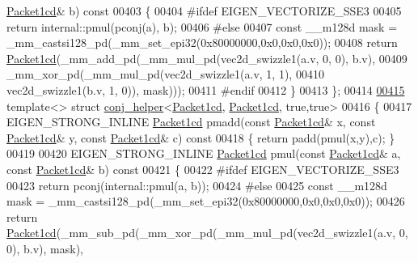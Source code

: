 \begin{DoxyCode}
      \hyperlink{struct_eigen_1_1internal_1_1_packet1cd}{Packet1cd}& b)\textcolor{keyword}{ const}
00403 \textcolor{keyword}{  }\{
00404 \textcolor{preprocessor}{    #ifdef EIGEN\_VECTORIZE\_SSE3}
00405     \textcolor{keywordflow}{return} internal::pmul(pconj(a), b);
00406 \textcolor{preprocessor}{    #else}
00407     \textcolor{keyword}{const} \_\_m128d mask = \_mm\_castsi128\_pd(\_mm\_set\_epi32(0x80000000,0x0,0x0,0x0));
00408     \textcolor{keywordflow}{return} \hyperlink{struct_eigen_1_1internal_1_1_packet1cd}{Packet1cd}(\_mm\_add\_pd(\_mm\_mul\_pd(vec2d\_swizzle1(a.v, 0, 0), b.v),
00409                                 \_mm\_xor\_pd(\_mm\_mul\_pd(vec2d\_swizzle1(a.v, 1, 1),
00410                                                       vec2d\_swizzle1(b.v, 1, 0)), mask)));
00411 \textcolor{preprocessor}{    #endif}
00412   \}
00413 \};
00414 
\hyperlink{struct_eigen_1_1internal_1_1conj__helper_3_01_packet1cd_00_01_packet1cd_00_01true_00_01true_01_4}{00415} \textcolor{keyword}{template}<> \textcolor{keyword}{struct }\hyperlink{struct_eigen_1_1internal_1_1conj__helper}{conj\_helper}<\hyperlink{struct_eigen_1_1internal_1_1_packet1cd}{Packet1cd}, \hyperlink{struct_eigen_1_1internal_1_1_packet1cd}{Packet1cd}, true,true>
00416 \{
00417   EIGEN\_STRONG\_INLINE \hyperlink{struct_eigen_1_1internal_1_1_packet1cd}{Packet1cd} pmadd(\textcolor{keyword}{const} \hyperlink{struct_eigen_1_1internal_1_1_packet1cd}{Packet1cd}& x, \textcolor{keyword}{const} 
      \hyperlink{struct_eigen_1_1internal_1_1_packet1cd}{Packet1cd}& y, \textcolor{keyword}{const} \hyperlink{struct_eigen_1_1internal_1_1_packet1cd}{Packet1cd}& c)\textcolor{keyword}{ const}
00418 \textcolor{keyword}{  }\{ \textcolor{keywordflow}{return} padd(pmul(x,y),c); \}
00419 
00420   EIGEN\_STRONG\_INLINE \hyperlink{struct_eigen_1_1internal_1_1_packet1cd}{Packet1cd} pmul(\textcolor{keyword}{const} \hyperlink{struct_eigen_1_1internal_1_1_packet1cd}{Packet1cd}& a, \textcolor{keyword}{const} 
      \hyperlink{struct_eigen_1_1internal_1_1_packet1cd}{Packet1cd}& b)\textcolor{keyword}{ const}
00421 \textcolor{keyword}{  }\{
00422 \textcolor{preprocessor}{    #ifdef EIGEN\_VECTORIZE\_SSE3}
00423     \textcolor{keywordflow}{return} pconj(internal::pmul(a, b));
00424 \textcolor{preprocessor}{    #else}
00425     \textcolor{keyword}{const} \_\_m128d mask = \_mm\_castsi128\_pd(\_mm\_set\_epi32(0x80000000,0x0,0x0,0x0));
00426     \textcolor{keywordflow}{return} \hyperlink{struct_eigen_1_1internal_1_1_packet1cd}{Packet1cd}(\_mm\_sub\_pd(\_mm\_xor\_pd(\_mm\_mul\_pd(vec2d\_swizzle1(a.v, 0, 0), b.v), mask),

\end{DoxyCode}

